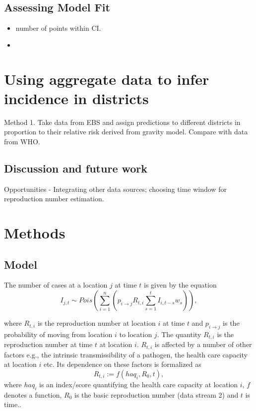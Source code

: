 \documentclass[a4paper,12pt]{article}
\begin{document}
 \subsection*{Assessing Model Fit}
 \begin{itemize}
 \item number of points within CI.
 \item   
 \end{itemize}
 
 \section*{Using aggregate data to infer incidence in districts}

 Method 1. Take data from EBS and assign predictions to different
 districts in proportion to their relative risk derived from gravity
 model. Compare with data from WHO.

 \subsection*{Discussion and future work}

 Opportunities - Integrating other data sources; choosing time
 window for reproduction number estimation.

 \section*{Methods}
 \subsection*{Model}
 The number of cases at a location \(j\) at time \(t\) is given by the equation
\[
  I_{j, t} \sim Pois\left( \sum_{i = 1}^{n} {\left( p_{i \rightarrow j}
  R_{t, i} \sum_{s = 1}^{t}{I_{i, t - s} w_{s}}\right)} \right),
\]

where \(R_{t, i}\) is the reproduction number at location \(i\) at time
\(t\) and \(p_{i \rightarrow j}\) is the probability of moving from
location \(i\) to location \(j\). The quantity $R_{t, i}$ is the
reproduction number at time $t$ at location $i$. $R_{t, i}$ is
affected by a number of other factors e.g., the intrinsic
transmissibility of a pathogen, the health care capacity at location
$i$ etc. Its dependence on these factors is formalized as
\[ R_{t, i} := f(haq_i, R_0, t),\]
where $haq_i$ is an index/score quantifying the health care capacity at location 
$i$, $f$ denotes a function, $R_0$ is the basic reproduction number (data stream 2) and $t$ is time..
\end{document}

